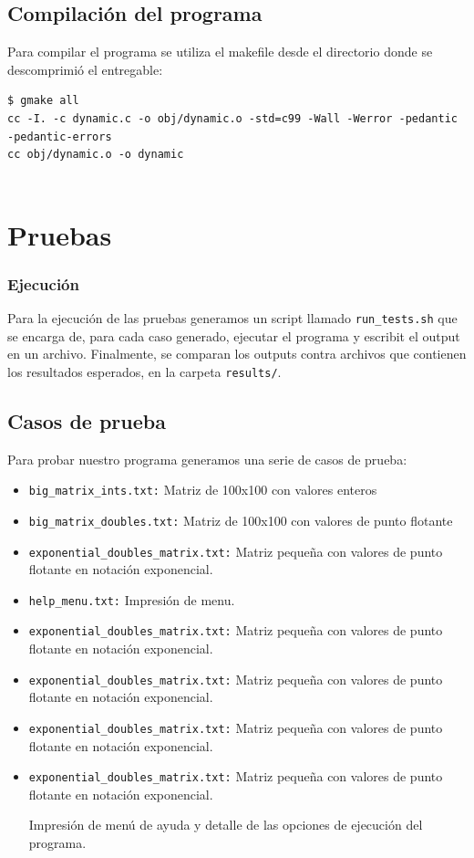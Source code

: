 \documentclass[a4paper,10pt, spanish]{article}
\begin{document}


\lstset{
  language=bash,
  basicstyle=\small\ttfamily
}

\subsection{Compilación del programa}
Para compilar el programa se utiliza el makefile desde el directorio donde se descomprimió el entregable:
\begin{lstlisting}
$ gmake all
cc -I. -c dynamic.c -o obj/dynamic.o -std=c99 -Wall -Werror -pedantic -pedantic-errors
cc obj/dynamic.o -o dynamic
	
\end{lstlisting}

\section{Pruebas}

\subsubsection{Ejecución}

Para la ejecución de las pruebas generamos un script llamado \lstinline{run_tests.sh} que se encarga de, para cada caso generado, ejecutar el programa y escribit el output en un archivo.
Finalmente, se comparan los outputs contra archivos que contienen los resultados esperados, en la carpeta \lstinline{results/}.

\subsection{Casos de prueba}

Para probar nuestro programa generamos una serie de casos de prueba:

\begin{itemize}
  \item \lstinline{big_matrix_ints.txt:} Matriz de 100x100 con valores enteros
	\item \lstinline{big_matrix_doubles.txt:} Matriz de 100x100 con valores de punto flotante
  \item \lstinline{exponential_doubles_matrix.txt:} Matriz pequeña con valores de punto flotante en notación exponencial. 
  \item \lstinline{help_menu.txt:} Impresión de menu. 
  \item \lstinline{exponential_doubles_matrix.txt:} Matriz pequeña con valores de punto flotante en notación exponencial. 
  \item \lstinline{exponential_doubles_matrix.txt:} Matriz pequeña con valores de punto flotante en notación exponencial. 
  \item \lstinline{exponential_doubles_matrix.txt:} Matriz pequeña con valores de punto flotante en notación exponencial. 
  \item \lstinline{exponential_doubles_matrix.txt:} Matriz pequeña con valores de punto flotante en notación exponencial. 
  
  Impresión de menú de ayuda y detalle de las opciones de ejecución del programa.
\end{itemize}
\end{document}
